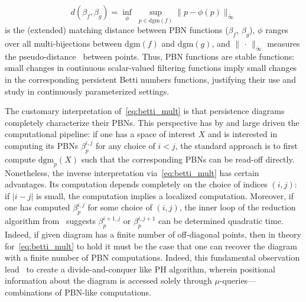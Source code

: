 \begin{equation*}\label{eq:pbn_stability}
	d(\beta_f, \beta_g) = \inf\limits_{\phi} \; \sup\limits_{p \in \mathrm{dgm}(f)} \lVert p - \phi(p) \rVert_{\widetilde{\infty} }
\end{equation*}
is the (extended) matching distance between PBN functions ($\beta_f$, $\beta_g$), $\phi$ ranges over all multi-bijections between $\mathrm{dgm}(f)$ and $\mathrm{dgm}(g)$, and $\lVert \,\cdot \, \rVert_{\widetilde{\infty}}$ measures the pseudo-distance~\cite{cerri2013betti} between points.
Thus, PBN functions are stable functions: small changes in continuous scalar-valued filtering functions imply small changes in the corresponding persistent Betti numbers functions, justifying their use and study in continuously parameterized settings. 

The customary interpretation of~\eqref{eq:betti_mult} is that persistence diagrams completely characterize their PBNs. This perspective has by and large driven the computational pipeline: if one has a space of interest $X$ and is interested in computing its PBNs $\beta_p^{i,j}$ for any choice of $i < j$, the standard approach is to first compute $\mathrm{dgm}_p(X)$ such that the corresponding PBNs can be read-off directly.
Nonetheless, the inverse interpretation via~\eqref{eq:betti_mult} has certain advantages. Its computation depends completely on the choice of indices $(i,j)$: if $\lvert i - j \rvert$ is small, the computation implies a localized computation. Moreover, if one has computed $\beta_p^{i,j}$ for some choice of $(i,j)$, the inner loop of the reduction algorithm from~\cite{edelsbrunner2022computational} suggests  $\beta_p^{i+1,j}$ or $\beta_p^{i,j+1}$ can be determined quadratic time. 
Indeed, if given diagram has a finite number of off-diagonal points, then in theory for~\eqref{eq:betti_mult} to hold it must be the case that one can recover the diagram with a finite number of PBN computations. 
Indeed, this fundamental observation lead~\cite{chen2011output} to create a divide-and-conquer like PH algorithm, wherein positional information about the diagram is accessed solely through $\mu$-queries---combinations of PBN-like computations.


